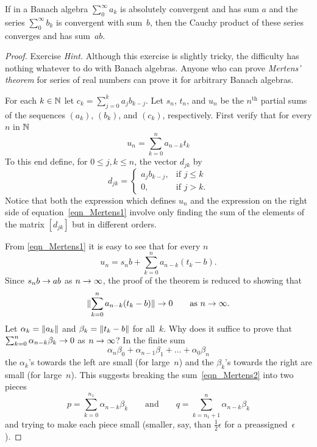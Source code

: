%
\begin{thm}\label{thm_Mertens} If in a Banach algebra $\sum_0^\infty a_k$ is
absolutely convergent and has sum $a$ and the series $\sum_0^\infty b_k$ is convergent with
sum~$b$, then the Cauchy product of these series converges and has sum~$ab$.
\end{thm}

\begin{proof}  Exercise \emph{Hint.}  Although this exercise is slightly tricky, the difficulty
has nothing whatever to do with Banach algebras.  Anyone who can prove \emph{Mertens' theorem}
for series of real numbers can prove it for arbitrary Banach algebras.

For each $k \in \mathbb{N}$ let $c_k = \sum_{j=0}^k a_j b_{k-j}$.  Let $s_n$, $t_n$, and $u_n$ be the
$n^{\text{th}}$ partial sums of the sequences $(a_k)$, $(b_k)$, and $(c_k)$, respectively.
First verify that for every $n$ in $\mathbb{N}$
  \begin{equation}\label{eqn_Mertens1}
        u_n =  \sum_{k=0}^n a_{n-k}t_k
  \end{equation}
To this end define, for $0 \le j,k \le n$, the vector $d_{jk}$ by
  \[ d_{jk} =
        \begin{cases}  a_jb_{k-j},   &\text{if $j \le k$} \\
                            0,       &\text{if $j > k$.}
        \end{cases}\]
Notice that both the expression which defines $u_n$ and the expression on the right side of
equation~\eqref{eqn_Mertens1} involve only finding the sum of the elements of the matrix
$[d_{jk}]$ but in different orders.

From \eqref{eqn_Mertens1} it is easy to see that for every $n$
  \[ u_n = s_nb + \sum_{k=0}^n a_{n-k}(t_k - b). \]
Since $s_n b \rightarrow ab$ as $n \rightarrow \infty$, the proof of the theorem is reduced to showing that
  \[ \lVert\sum_{k=0}^n a_{n-k}(t_k - b)\rVert \rightarrow 0 \qquad \text{as $n \rightarrow \infty$.} \]
Let $\alpha_k = \lVert a_k\rVert$ and $\beta_k = \lVert t_k - b\rVert$ for all~$k$.  Why does it suffice
to prove that $\sum_{k=0}^n \alpha_{n-k}\beta_k \rightarrow 0$ as $n \rightarrow \infty$? In the finite sum
 \begin{equation}\label{eqn_Mertens2}
     \alpha_n\beta_0 + \alpha_{n-1}\beta_1 + \dots + \alpha_0\beta_n
 \end{equation}
the $\alpha_k$'s towards the left are small (for large~$n$) and the $\beta_k$'s towards the
right are small (for large~$n$).  This suggests breaking the sum~\eqref{eqn_Mertens2} into two
pieces
  \[ p = \sum_{k=0}^{n_1} \alpha_{n-k}\beta_k \qquad \text{and}
                                 \qquad q = \sum_{k=n_1+1}^n \alpha_{n - k}\beta_k \]
and trying to make each piece small (smaller, say, than $\frac12\epsilon$ for a
preassigned~$\epsilon$).


\end{proof}
